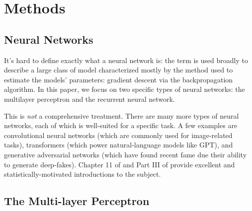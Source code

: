 \section{Methods}

%
%
%
%
%
%

\subsection{Neural Networks}

It's hard to define exactly what a neural network is: the term is used broadly to describe a large class of model characterized mostly by the method used to estimate the models' parameters: gradient descent via the backpropagation algorithm. In this paper, we focus on two specific types of neural networks: the multilayer perceptron and the recurrent neural network.

This is \emph{not} a comprehensive treatment. There are many more types of neural networks, each of which is well-suited for a specific task. A few examples are convolutional neural networks (which are commonly used for image-related tasks), transformers (which power natural-language models like GPT), and generative adversarial networks (which have found recent fame due their ability to generate deep-fakes). Chapter 11 of \textcite{ESL} and Part III of \textcite{PML} provide excellent and statistically-motivated introductions to the subject.

\subsection{The Multi-layer Perceptron}

